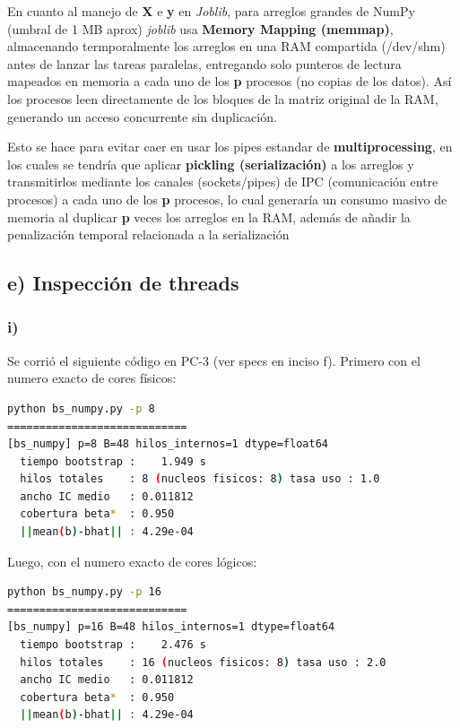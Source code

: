 \documentclass[11pt]{article}
\begin{document}
En cuanto al manejo de \textbf{X} e \textbf{y} en \textit{Joblib}, para arreglos grandes de NumPy (umbral de 1 MB aprox) \textit{joblib} usa \textbf{Memory Mapping (memmap)}, almacenando termporalmente los arreglos en una RAM compartida (/dev/shm) antes de lanzar las tareas paralelas, entregando solo punteros de lectura mapeados en memoria a cada uno de los \textbf{p} procesos (no copias de los datos). As\'i los procesos leen directamente de los bloques de la matriz original de la RAM, generando un acceso concurrente sin duplicaci\'on.

Esto se hace para evitar caer en usar los pipes estandar de \textbf{multiprocessing}, en los cuales se tendr\'ia que aplicar \textbf{pickling (serializaci\'on)} a los arreglos y transmitirlos mediante los canales (sockets/pipes) de IPC (comunicaci\'on entre procesos) a cada uno de los \textbf{p} procesos, lo cual generar\'ia un consumo masivo de memoria al duplicar \textbf{p} veces los arreglos en la RAM, adem\'as de a\~nadir la penalizaci\'on temporal relacionada a la serializaci\'on

\subsection*{e) Inspecci\'on de threads}

\subsubsection*{i)}

Se corri\'o el siguiente c\'odigo en PC-3 (ver specs en inciso f). Primero con el numero exacto de cores f\'isicos:

\begin{lstlisting}[language=sh]
python bs_numpy.py -p 8
============================
[bs_numpy] p=8 B=48 hilos_internos=1 dtype=float64
  tiempo bootstrap :    1.949 s
  hilos totales    : 8 (nucleos fisicos: 8) tasa uso : 1.0
  ancho IC medio   : 0.011812
  cobertura beta*  : 0.950
  ||mean(b)-bhat|| : 4.29e-04
\end{lstlisting}

Luego, con el numero exacto de cores l\'ogicos:

\begin{lstlisting}[language=sh]
python bs_numpy.py -p 16
============================
[bs_numpy] p=16 B=48 hilos_internos=1 dtype=float64
  tiempo bootstrap :    2.476 s
  hilos totales    : 16 (nucleos fisicos: 8) tasa uso : 2.0
  ancho IC medio   : 0.011812
  cobertura beta*  : 0.950
  ||mean(b)-bhat|| : 4.29e-04
\end{lstlisting}
\end{document}
